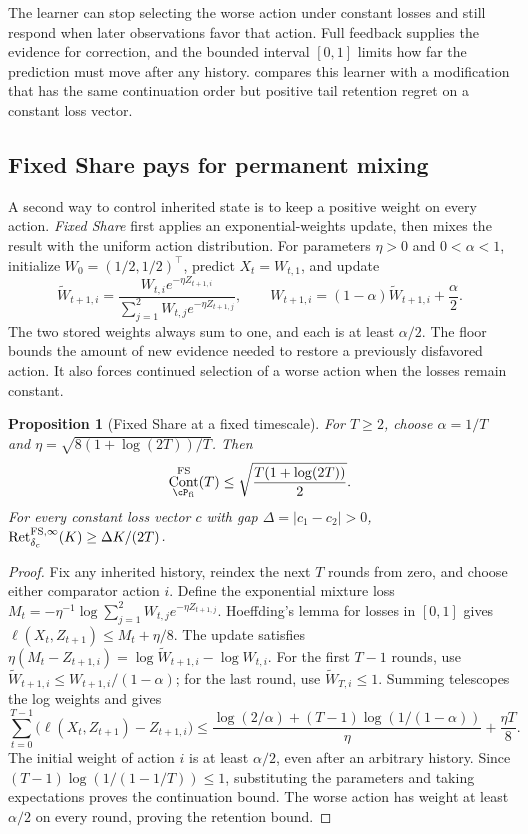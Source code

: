 \documentclass[11pt,twoside]{article}
\newtheorem{proposition}[theorem]{Proposition}
\theoremstyle{definition}
\theoremstyle{remark}
\DeclareMathOperator{\Cont}{Cont}
\DeclareMathOperator{\Ret}{Ret}
\begin{document}
The learner can stop selecting the worse action under constant losses and
still respond when later observations favor that action. Full feedback
supplies the evidence for correction, and the bounded interval $[0,1]$
limits how far the prediction must move after any history.
 compares this
learner with a modification that has the same continuation order but
positive tail retention regret on a constant loss vector.

\subsection{Fixed Share pays for permanent mixing}

A second way to control inherited state is to keep a positive weight on
every action. \emph{Fixed Share} first applies an exponential-weights
update, then mixes the result with the uniform action distribution.
For parameters $\eta>0$ and $0<\alpha<1$, initialize
$W_0=(1/2,1/2)^\top$, predict $X_t=W_{t,1}$, and update
\begin{equation}
 \widetilde W_{t+1,i}
 =\frac{W_{t,i}e^{-\eta Z_{t+1,i}}}
        {\sum_{j=1}^2 W_{t,j}e^{-\eta Z_{t+1,j}}},\qquad
 W_{t+1,i}=(1-\alpha)\widetilde W_{t+1,i}+\frac\alpha2.
 \label{eq:fixed-share}
\end{equation}
The two stored weights always sum to one, and each is at least $\alpha/2$.
The floor bounds the amount of new evidence needed to restore a previously
disfavored action. It also forces continued selection of a worse action
when the losses remain constant.

\begin{proposition}[Fixed Share at a fixed timescale]
\label{ex:fixed-share}
For $T\ge2$, choose $\alpha=1/T$ and
$\eta=\sqrt{8(1+\log(2T))/T}$. Then
\[
 \Cont_{\cP_{\rm fi}}^{\rm FS}(T)
 \le\sqrt{\frac{T(1+\log(2T))}{2}}.
\]
For every constant loss vector $c$ with gap $\Delta=|c_1-c_2|>0$,
$\Ret_{\delta_c}^{{\rm FS},\infty}(K)\ge\Delta K/(2T)$.
\end{proposition}
\begin{proof}
Fix any inherited history, reindex the next $T$ rounds from zero, and
choose either comparator action $i$. Define the exponential mixture loss
$M_t=-\eta^{-1}\log\sum_{j=1}^2W_{t,j}e^{-\eta Z_{t+1,j}}$.
Hoeffding's lemma for losses in $[0,1]$ gives
$\ell(X_t,Z_{t+1})\le M_t+\eta/8$.
The update satisfies
$\eta(M_t-Z_{t+1,i})=\log\widetilde W_{t+1,i}-\log W_{t,i}$.
For the first $T-1$ rounds, use
$\widetilde W_{t+1,i}\le W_{t+1,i}/(1-\alpha)$; for the last round,
use $\widetilde W_{T,i}\le1$. Summing telescopes the log weights and gives
\[
 \sum_{t=0}^{T-1}\bigl(\ell(X_t,Z_{t+1})-Z_{t+1,i}\bigr)
 \le\frac{\log(2/\alpha)+(T-1)\log(1/(1-\alpha))}{\eta}
        +\frac{\eta T}{8}.
\]
The initial weight of action $i$ is at least $\alpha/2$, even after an
arbitrary history. Since $(T-1)\log(1/(1-1/T))\le1$, substituting the
parameters and taking expectations proves the continuation bound.
The worse action has weight at least $\alpha/2$ on every round, proving
the retention bound.
\end{proof}
\end{document}
